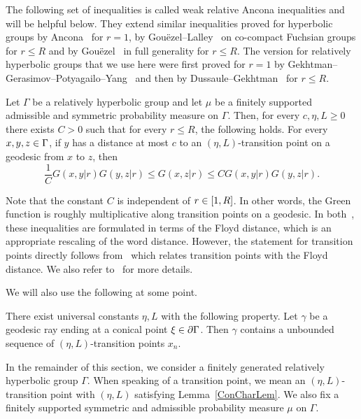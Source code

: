 \documentclass[AHL,Unicode,longabstracts]{cedram}
\newcommand{\pG}{\partial{\Gamma}}
\let\oldin\in
\renewcommand{\in}{\mathchoice{\oldin}{\oldin}{\,\oldin\,}{\,\oldin\,}}
\begin{document}
The following set of inequalities is called weak relative Ancona inequalities and will be helpful below. They extend similar inequalities proved for hyperbolic groups by Ancona~\cite{Ancona} for $r=1$, by Gou\"ezel--Lalley~\cite{GouezelLalley} on co-compact Fuchsian groups for $r\leq R$ and by Gou\"ezel~\cite{Gouezel} in full generality for $r\leq R$. The version for relatively hyperbolic groups that we use here were first proved for $r=1$ by Gekhtman--Gerasimov--Potyagailo--Yang~\cite{GGPY} and then by Dussaule--Gekhtman~\cite{DG21} for $r\leq R$.

\begin{lemm}
\label{weakAncona}
Let $\Gamma$ be a relatively hyperbolic group and let $\mu$ be a finitely supported admissible and symmetric probability measure on $\Gamma$. Then, for every $c,\eta,L\geq 0$ there exists $C>0$ such that for every $r\leq R$, the following holds. For every $x,y,z\in \Gamma$, if $y$ has a distance at most $c$ to an $(\eta,L)$-transition point on a geodesic from $x$ to $z$, then
\[
\frac{1}{C}G(x,y|r)G(y,z|r)\leq G(x,z|r)\leq C G(x,y|r)G(y,z|r).
\]
\end{lemm}

Note that the constant $C$ is independent of $r\in [1,R]$. In other words, the Green function is roughly multiplicative along transition points on a geodesic. In both~\cite{DG21,GGPY}, these inequalities are formulated in terms of the Floyd distance, which is an appropriate rescaling of the word distance. However, the statement for transition points directly follows from~\cite[Corollary~5.10]{GePoGGD} which relates transition points with the Floyd distance. We also refer to~\cite[Section~9]{GGPY} for more details.

We will also use the following at some point.

\begin{lemm}\label{ConCharLem}
There exist universal constants $\eta, L$ with the following property. Let $\gamma$ be a geodesic ray ending at a conical point $\xi\in\pG$. Then $\gamma$ contains a unbounded sequence of $(\eta,L)$-transition points $x_n$.
\end{lemm}


In the remainder of this section, we consider a finitely generated relatively hyperbolic group $\Gamma$. When speaking of a transition point, we mean an $(\eta,L)$-transition point with $(\eta,L)$ satisfying Lemma~\ref{ConCharLem}. We also fix a finitely supported symmetric and admissible probability measure $\mu$ on $\Gamma$.
\end{document}
